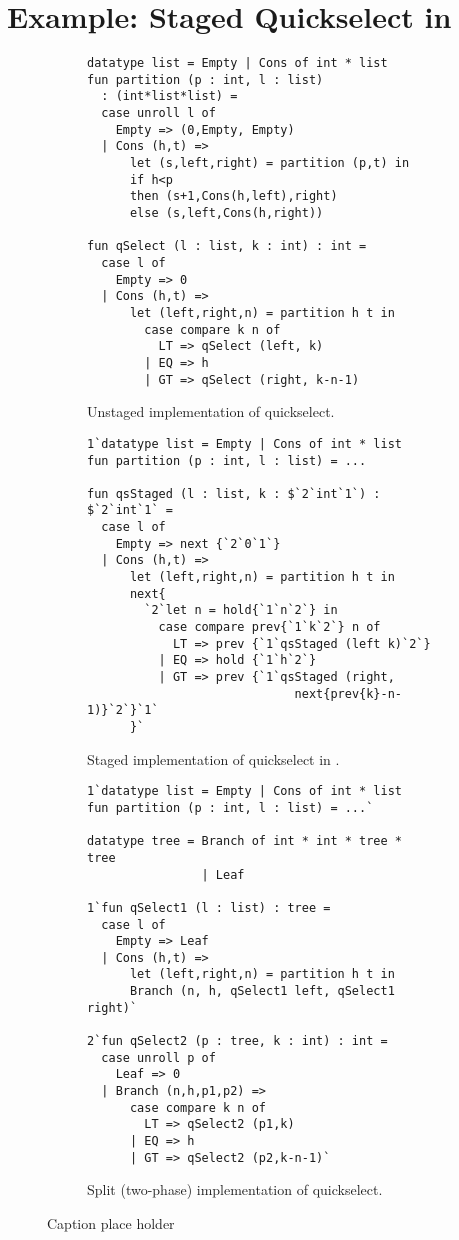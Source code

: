 \section {Example: Staged Quickselect in \texorpdfstring{\lang}{λ12}}
\label{sec:staging}


\begin{figure*}
\begin{subfigure}{0.5\textwidth}
\begin{lstlisting} 
datatype list = Empty | Cons of int * list
fun partition (p : int, l : list) 
  : (int*list*list) =
  case unroll l of 
    Empty => (0,Empty, Empty) 
  | Cons (h,t) =>
      let (s,left,right) = partition (p,t) in
      if h<p 
      then (s+1,Cons(h,left),right)
      else (s,left,Cons(h,right))

fun qSelect (l : list, k : int) : int = 
  case l of
    Empty => 0
  | Cons (h,t) => 
      let (left,right,n) = partition h t in
        case compare k n of
          LT => qSelect (left, k)
        | EQ => h
        | GT => qSelect (right, k-n-1)
\end{lstlisting}
\caption{Unstaged implementation of quickselect.}
\label{fig:quickselect}
\end{subfigure}%
\begin{subfigure}{0.5\textwidth}
\begin{lstlisting} 
1`datatype list = Empty | Cons of int * list
fun partition (p : int, l : list) = ...

fun qsStaged (l : list, k : $`2`int`1`) : $`2`int`1` = 
  case l of
    Empty => next {`2`0`1`}
  | Cons (h,t) => 
      let (left,right,n) = partition h t in
      next{
        `2`let n = hold{`1`n`2`} in
          case compare prev{`1`k`2`} n of
            LT => prev {`1`qsStaged (left k)`2`}
          | EQ => hold {`1`h`2`}
          | GT => prev {`1`qsStaged (right, 
                             next{prev{k}-n-1)}`2`}`1`
      }`
\end{lstlisting}
\caption{Staged implementation of quickselect in \lang.}
\label{fig:qsstaged}
\end{subfigure}
\begin{subfigure}{0.5\textwidth}
\begin{lstlisting}
1`datatype list = Empty | Cons of int * list
fun partition (p : int, l : list) = ...`
	
datatype tree = Branch of int * int * tree * tree
                | Leaf

1`fun qSelect1 (l : list) : tree =
  case l of
    Empty => Leaf
  | Cons (h,t) => 
      let (left,right,n) = partition h t in
      Branch (n, h, qSelect1 left, qSelect1 right)`

2`fun qSelect2 (p : tree, k : int) : int = 
  case unroll p of
    Leaf => 0
  | Branch (n,h,p1,p2) => 
      case compare k n of
        LT => qSelect2 (p1,k)
      | EQ => h
      | GT => qSelect2 (p2,k-n-1)`
\end{lstlisting}
\caption{Split (two-phase) implementation of quickselect.}
\label{fig:qssplit}
\end{subfigure}
\caption{Caption place holder}
\end{figure*}

